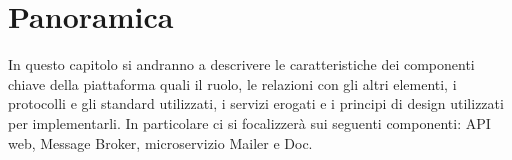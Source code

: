 \section{Panoramica}
In questo capitolo si andranno a descrivere le caratteristiche dei componenti chiave della piattaforma quali il ruolo, le relazioni con gli altri elementi,
i protocolli e gli standard utilizzati, i servizi erogati e i principi di design utilizzati per implementarli.
In particolare ci si focalizzerà sui seguenti componenti: API web, Message Broker, microservizio Mailer e Doc.
